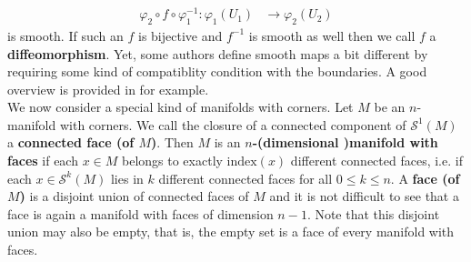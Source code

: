 \begin{align*}
  \varphi_{2}
  \circ
  f
  \circ
  \varphi_{1}^{-1}
  \colon
  \varphi_{1}(U_{1})
  &\to
  \varphi_{2}(U_{2})
\end{align*}
is smooth. If such an $f$ is bijective and $f^{-1}$ is smooth as well then we call $f$ a \textbf{diffeomorphism}. Yet, some authors define smooth maps a bit different by requiring some kind of compatiblity condition with the boundaries. A good overview is provided in \cite{a9a08fe2} for example.
\\
We now consider a special kind of manifolds with corners. Let $M$ be an $n$-manifold with corners. We call the closure of a connected component of $\mathcal{S}^{1}(M)$ a \textbf{connected face (of $M$)}. Then $M$ is an \textbf{$n$-(dimensional )manifold with faces} if each $x \in M$ belongs to exactly $\mathrm{index}(x)$ different connected faces, i.e. if each $x \in \mathcal{S}^{k}(M)$ lies in $k$ different connected faces for all $0 \leq k \leq n$. A \textbf{face (of $M$)} is a disjoint union of connected faces of $M$ and it is not difficult to see that a face is again a manifold with faces of dimension $n-1$. Note that this disjoint union may also be empty, that is, the empty set is a face of every manifold with faces.
\\
